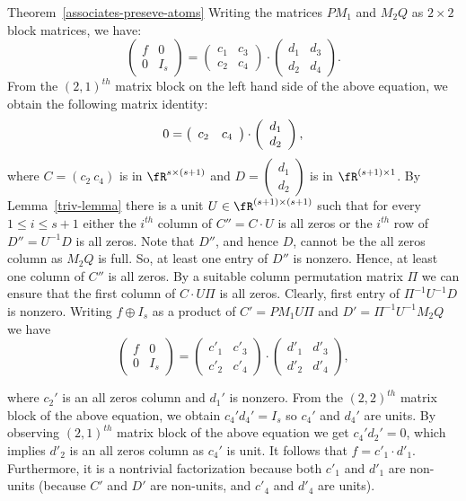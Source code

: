 \begin{proofof}{Theorem~\ref{associates-preseve-atoms}}
Writing the matrices $PM_1$ and $M_2Q$ as $2\times 2$ block matrices,
we have:
\[\left(
\begin{array}{c|c}
f & 0 \\
\hline
0 & I_s
\end{array}
\right) 
= \left(
\begin{array}{c|c}
c_1 & c_3 \\
\hline
c_2 & c_4
\end{array}
\right)\cdot 
\left(
\begin{array}{c|c}
d_1 & d_3 \\
\hline
d_2 & d_4
\end{array}
\right).
\]
{From} the $(2,1)^{th}$ matrix block on the left hand side of the
above equation, we obtain the following matrix identity:
\[
0 = \left(
\begin{array}{c c}
c_2 & c_4
\end{array}
\right)\cdot 
\left(
\begin{array}{c}
d_1 \\
d_2
\end{array}
\right),
\]
where $C=(c_2~c_4)$ is in $\fR^{s\times (s+1)}$ and $D=\left(
\begin{array}{c}
d_1 \\
d_2
\end{array}
\right)$ is in $\fR^{(s+1)\times 1}$. By Lemma~\ref{triv-lemma} there
is a unit $U\in \fR^{(s+1)\times (s+1)}$ such that for every $1\le
i\le s+1$ either the $i^{th}$ column of $C''=C\cdot U$ is all zeros or
the $i^{th}$ row of $D''=U^{-1} D$ is all zeros.  Note that $D''$, and
hence $D$, cannot be the all zeros column as $M_2Q$ is full. So, at
least one entry of $D''$ is nonzero. Hence, at least one column of
$C''$ is all zeros. By a suitable column permutation matrix $\Pi$ we
can ensure that the first column of $C \cdot U \Pi$ is all zeros.
Clearly, first entry of $ \Pi^{-1}U^{-1} D$ is nonzero. Writing $f
\oplus I_s$ as a product of $C'= PM_1U\Pi$ and $D'=\Pi^{-1}U^{-1}M_2Q$
we have
\[\left(
\begin{array}{c|c}
f & 0 \\
\hline
0 & I_s
\end{array}
\right) 
= \left(
\begin{array}{c|c}
c'_1 & c'_3 \\
\hline
c'_2 & c'_4
\end{array}
\right)\cdot
\left(
\begin{array}{c|c}
d'_1 & d'_3 \\
\hline
d'_2 & d'_4
\end{array}
\right),
\]

where $c_2'$ is an all zeros column and $d_1'$ is nonzero. {From} the
$(2,2)^{th}$ matrix block of the above equation, we obtain $c_4' d_4'
= I_s$ so $c_4'$ and $d_4'$ are units. By observing $(2,1)^{th}$
matrix block of the above equation we get $c_4' d_2' =0$, which
implies $d'_2$ is an all zeros column as $c_4'$ is unit.  It follows
that $f=c'_1\cdot d'_1$. Furthermore, it is a nontrivial factorization
because both $c'_1$ and $d'_1$ are non-units (because $C'$ and $D'$
are non-units, and $c'_4$ and $d'_4$ are units).
\end{proofof} 
